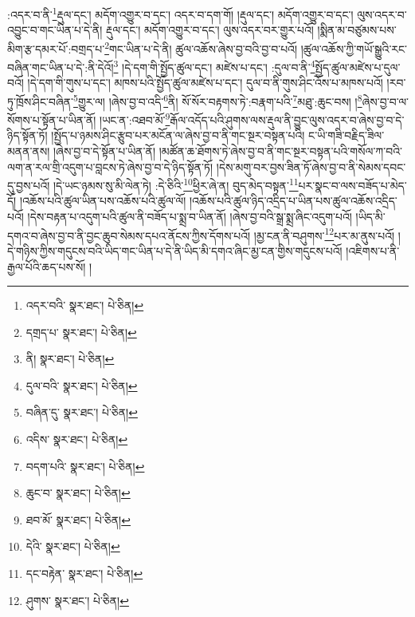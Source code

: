 :འདར་བ་ནི་\footnote{འདར་བའི་  སྣར་ཐང་།  པེ་ཅིན། }རྡུལ་དང་། མདོག་འགྱུར་བ་དང་། འདར་བ་དག་གོ། །རྡུལ་དང་། མདོག་འགྱུར་བ་དང་། ལུས་འདར་བ་འབྱུང་བ་གང་ཡིན་པ་དེ་ནི། རྡུལ་དང་། མདོག་འགྱུར་བ་དང་། ལུས་འདར་བར་གྱུར་པའོ། །སྨིན་མ་བཙུམས་པས་མིག་རྩ་དམར་པོ་:བགྲད་པ་\footnote{དགྲད་པ་  སྣར་ཐང་།  པེ་ཅིན། }གང་ཡིན་པ་དེ་ནི། ཚུལ་འཆོས་ཞེས་བྱ་བའི་བྱ་བ་པའོ། །ཚུལ་འཆོས་ཀྱི་གཡོ་སྒྱུའི་རང་བཞིན་གང་ཡིན་པ་དེ་:ནི་དེའོ།\footnote{ནི།  སྣར་ཐང་།  པེ་ཅིན། } །དེ་དག་གི་སྤྱོད་ཚུལ་དང་། མཛེས་པ་དང་། :དུལ་བ་ནི་\footnote{དུལ་བའི་  སྣར་ཐང་།  པེ་ཅིན། }སྤྱོད་ཚུལ་མཛེས་པ་དུལ་བའོ། །དེ་དག་གི་གུས་པ་དང་། མཁས་པའི་སྤྱོད་ཚུལ་མཛེས་པ་དང་། དུལ་བ་ནི་གུས་ཤིང་འོས་པ་མཁས་པའོ། །རབ་ཏུ་ཁྲོས་ཤིང་བཞིན་\footnote{བཞིན་དུ་  སྣར་ཐང་།  པེ་ཅིན། }གྱུར་ལ། །ཞེས་བྱ་བ་འདི་\footnote{འདིས་  སྣར་ཐང་།  པེ་ཅིན། }ནི། སོ་སོར་བརྟགས་ཏེ་:བརྣག་པའི་\footnote{བདག་པའི་  སྣར་ཐང་།  པེ་ཅིན། }མཐུ་:ཆུང་བས། །\footnote{ཆུང་བ་  སྣར་ཐང་།  པེ་ཅིན། }ཞེས་བྱ་བ་ལ་སོགས་པ་སྟོན་པ་ཡིན་ནོ། །ཡང་ན་:འཐབ་མོ་\footnote{ཐབ་མོ་  སྣར་ཐང་།  པེ་ཅིན། }རྒོལ་འདོད་པའི་ཤུགས་ལས་རྡུལ་ནི་བྱུང་ལུས་འདར་བ་ཞེས་བྱ་བ་དེ་ཉིད་སྟོན་ཏོ། །སྤྱོད་པ་ཉམས་ཤིང་རྩུབ་པར་མངོན་ལ་ཞེས་བྱ་བ་ནི་གང་སྔར་བསྟན་པའི། ང་ཡི་གཟི་བརྗིད་ཟིལ་མནན་ནས། །ཞེས་བྱ་བ་དེ་སྟོན་པ་ཡིན་ནོ། །མཚོན་ཆ་ཐོགས་ཏེ་ཞེས་བྱ་བ་ནི་གང་སྔར་བསྟན་པའི་གསོལ་ཀ་བའི་ལག་ན་རལ་གྲི་འདུག་པ་བླངས་ཏེ་ཞེས་བྱ་བ་དེ་ཉིད་སྟོན་ཏོ། །དེས་མགུ་བར་བྱས་ཟིན་ཏོ་ཞེས་བྱ་བ་ནི་སེམས་དབང་དུ་བྱས་པའོ། །དེ་ཡང་ཉམས་སུ་མི་ལེན་ཏེ། :དེ་ཅིའི་\footnote{དེའི་  སྣར་ཐང་།  པེ་ཅིན། }ཕྱིར་ཞེ་ན། བུད་མེད་བསྟན་\footnote{དང་བརྟེན་  སྣར་ཐང་།  པེ་ཅིན། }པར་སྣང་བ་ལས་བཟོད་པ་མེད་དོ། །འཆོས་པའི་ཚུལ་ཡིན་པས་འཆོས་པའི་ཚུལ་ལོ། །འཆོས་པའི་ཚུལ་ཉིད་འདྲིད་པ་ཡིན་པས་ཚུལ་འཆོས་འདྲིད་པའོ། །དེས་བརྟན་པ་འདུག་པའི་ཚུལ་ནི་བཟོད་པ་སྨྲ་བ་ཡིན་ནོ། །ཞེས་བྱ་བའི་སྒྲ་སྨྲ་ཞིང་འདུག་པའོ། །ཡིད་མི་དགའ་བ་ཞེས་བྱ་བ་ནི་བྱང་ཆུབ་སེམས་དཔའ་ནོངས་ཀྱིས་དོགས་པའོ། །མྱ་ངན་ནི་བཤུགས་\footnote{ཤུགས་  སྣར་ཐང་།  པེ་ཅིན། }པར་མ་ནུས་པའོ། །དེ་གཉིས་ཀྱིས་གདུངས་བའི་ཡིད་གང་ཡིན་པ་དེ་ནི་ཡིད་མི་དགའ་ཞིང་མྱ་ངན་གྱིས་གདུངས་པའོ། །འཇིགས་པ་ནི་རྒྱལ་པོའི་ཆད་པས་སོ། །
